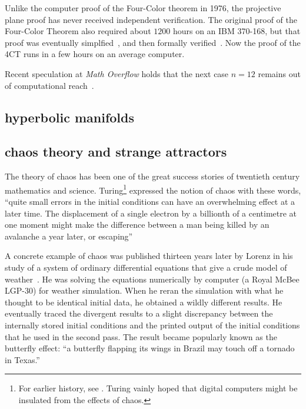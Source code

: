 \documentclass{llncs}
\begin{document}
Unlike the computer proof of the Four-Color theorem in 1976, the
projective plane proof has never received independent verification.
The original proof of the Four-Color Theorem also required about
$1200$ hours on an IBM 370-168, but that proof was eventually
simplfied~\cite{Robertson:1997:JCTB}, and then formally
verified~\cite{gonthier:2008:formal}.  Now the proof of the 4CT runs
in a few hours on an average computer.


Recent speculation at {\it Math Overflow} holds that the next case
$n=12$ remains out of computational reach~\cite{Horn}.



\subsection{hyperbolic manifolds}


\subsection{chaos theory and strange attractors}

The theory of chaos has been one of the great success stories of
twentieth century mathematics and science.  Turing\footnote{For
  earlier history, see \cite[p.~971]{Wolfram:NKS}. Turing vainly hoped that
  digital computers might be insulated from the effects of chaos.}
expressed the notion of chaos with these words, ``quite small errors
in the initial conditions can have an overwhelming effect at a later
time.  The displacement of a single electron by a billionth of a
centimetre at one moment might make the difference between a man being
killed by an avalanche a year later, or escaping''~\cite{Tu50}

A concrete example of chaos was published thirteen years later by
Lorenz in his study of a system of ordinary
differential equations that give a crude model of weather~\cite{Lo63}.  He was solving the equations numerically by computer (a Royal McBee LGP-30) for weather
simulation.  When he reran the simulation with what he thought to be
identical initial data, he obtained a wildly different results.  He
eventually traced the divergent results to a slight discrepancy
between the internally stored initial conditions and the printed
output of the initial conditions that he used in the second pass.  The
result became popularly known as the butterfly effect: ``a butterfly
flapping its wings in Brazil may touch off a tornado in Texas.''
\end{document}
